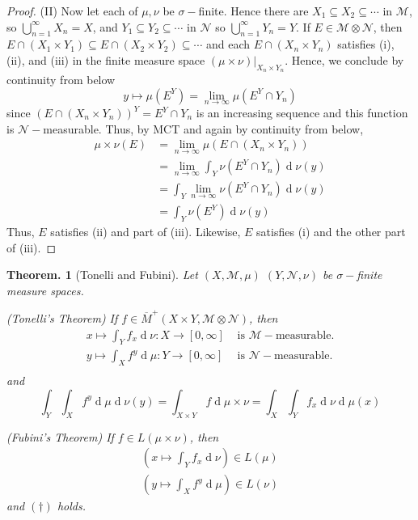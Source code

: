 \documentclass[11pt, a4paper]{memoir}
\newcommand{\ol}[1]{\ensuremath{\overline{#1}}}
\theoremstyle{change}
\newtheorem{theorem}{Theorem.}[section]
\theoremstyle{plain}
\theoremstyle{nonumberplain}
\newtheorem{proof}{Proof}
\renewcommand{\d}[1]{\ensuremath{\operatorname{d}\!{#1}}}
\numberwithin{equation}{section}
\begin{document}
\begin{proof}
    (II) Now let each of $\mu,\nu$ be $\sigma-$finite.
    Hence there are $X_1\subseteq X_2\subseteq\cdots$ in $\mathcal{M}$, so $\bigcup_{n=1}^\infty X_n=X$, and $Y_1\subseteq Y_2\subseteq\cdots$ in $\mathcal{N}$ so $\bigcup_{n=1}^\infty Y_n=Y$.
    If $E\in\mathcal{M}\otimes\mathcal{N}$, then $E\cap(X_1\times Y_1)\subseteq E\cap(X_2\times Y_2)\subseteq\cdots$ and each $E\cap(X_n\times Y_n)$ satisfies (i), (ii), and (iii) in the finite measure space $(\mu\times\nu)|_{X_n\times Y_n}$.
    Hence, we conclude by continuity from below
    \begin{equation*}
        y\mapsto\mu(E^Y)=\lim_{n\to\infty}\mu(E^Y\cap Y_n)
    \end{equation*}
    since $\left(E\cap(X_n\times Y_n)\right)^Y=E^Y\cap Y_n$ is an increasing sequence and this function is $\mathcal{N}-$measurable.
    Thus, by MCT and again by continuity from below,
    \begin{align*}
        \mu\times\nu(E) &= \lim_{n\to\infty}\mu(E\cap(X_n\times Y_n))\\
                        &= \lim_{n\to\infty}\int_Y\nu(E^Y\cap Y_n)\d{\nu(y)}\\
                        &= \int_Y\lim_{n\to\infty}\nu(E^Y\cap Y_n)\d{\nu(y)}\\
                        &= \int_Y\nu(E^Y)\d{\nu(y)}
    \end{align*}
    Thus, $E$ satisfies (ii) and part of (iii).
    Likewise, $E$ satisfies (i) and the other part of (iii).
\end{proof}
\begin{theorem}[Tonelli and Fubini]
    Let $(X,\mathcal{M},\mu)$ $(Y,\mathcal{N},\nu)$ be $\sigma-$finite measure spaces.

    (\textit{Tonelli's Theorem}) If $f\in\ol{M}^+(X\times Y,\mathcal{M}\otimes\mathcal{N})$, then
    \begin{align*}
        x\mapsto \int_Y f_x\d{\nu}:X\to[0,\infty]&\text{ is $\mathcal{M}-$measurable.}\\
        y\mapsto \int_X f^y\d{\mu}:Y\to[0,\infty]&\text{ is $\mathcal{N}-$measurable.}\\
    \end{align*}
    and
    \begin{equation*}
        \int_Y\int_X f^y\d{\mu}\d{\nu(y)}=\int_{X\times Y}f\d{\mu\times\nu}=\int_X\int_Yf_x\d{\nu}\d{\mu(x)}\tag{$\dagger$}
    \end{equation*}

    (\textit{Fubini's Theorem}) If $f\in L(\mu\times\nu)$, then
    \begin{align*}
        \left(x\mapsto\int_Yf_x\d{\nu}\right)\in L(\mu)\\
        \left(y\mapsto\int_Xf^y\d{\mu}\right)\in L(\nu)
    \end{align*}
    and $(\dagger)$ holds.
\end{theorem}
\end{document}
